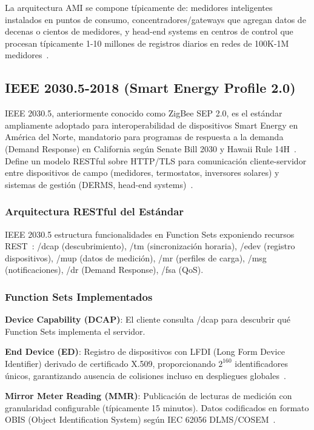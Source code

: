La arquitectura AMI se compone típicamente de: medidores inteligentes instalados en puntos de consumo, concentradores/gateways que agregan datos de decenas o cientos de medidores, y head-end systems en centros de control que procesan típicamente 1-10 millones de registros diarios en redes de 100K-1M medidores~\cite{alsafranChallengesImplementingIoT2025}.

\subsection{IEEE 2030.5-2018 (Smart Energy Profile 2.0)}

IEEE 2030.5, anteriormente conocido como ZigBee SEP 2.0, es el estándar ampliamente adoptado para interoperabilidad de dispositivos Smart Energy en América del Norte, mandatorio para programas de respuesta a la demanda (Demand Response) en California según Senate Bill 2030 y Hawaii Rule 14H~\cite{IEEERecommendedPractice,CaliforniaCPUC2023}. Define un modelo RESTful sobre HTTP/TLS para comunicación cliente-servidor entre dispositivos de campo (medidores, termostatos, inversores solares) y sistemas de gestión (DERMS, head-end systems)~\cite{tangResearchInteroperabilityIoT}.

\subsubsection{Arquitectura RESTful del Estándar}

IEEE 2030.5 estructura funcionalidades en Function Sets exponiendo recursos REST~\cite{IEEERecommendedPractice}: /dcap (descubrimiento), /tm (sincronización horaria), /edev (registro dispositivos), /mup (datos de medición), /mr (perfiles de carga), /msg (notificaciones), /dr (Demand Response), /fsa (QoS).

\subsubsection{Function Sets Implementados}

\textbf{Device Capability (DCAP)}: El cliente consulta /dcap para descubrir qué Function Sets implementa el servidor.

\textbf{End Device (ED)}: Registro de dispositivos con LFDI (Long Form Device Identifier) derivado de certificado X.509, proporcionando $2^{160}$ identificadores únicos, garantizando ausencia de colisiones incluso en despliegues globales~\cite{IEEERecommendedPractice}.

\textbf{Mirror Meter Reading (MMR)}: Publicación de lecturas de medición con granularidad configurable (típicamente 15 minutos). Datos codificados en formato OBIS (Object Identification System) según IEC 62056 DLMS/COSEM~\cite{IEC62056-2021}.

